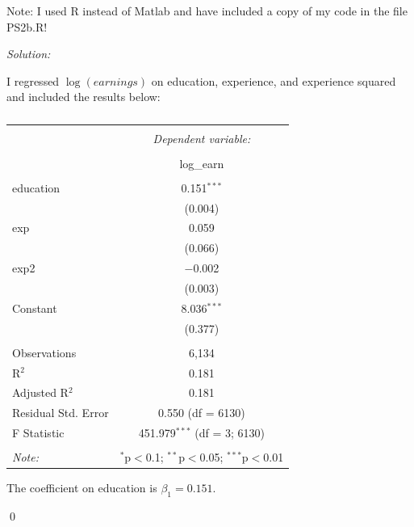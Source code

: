\documentclass[12pt]{article}
\newenvironment{problem}[2][Problem]{\begin{trivlist}
\item[\hskip \labelsep {\bfseries #1}\hskip \labelsep {\bfseries #2.}]}{\end{trivlist}}
\newenvironment{sol}
    {\emph{Solution:}
    }
    {
    \qed
    }
\begin{document}
Note: I used R instead of Matlab and have included a copy of my code in the file PS2b.R! 

\begin{problem}{1}
\end{problem}
\begin{sol}
I regressed $\log(earnings)$ on education, experience, and experience squared and included the results below:
\begin{table}[!htbp] \centering 
  \caption{} 
  \label{} 
\begin{tabular}{@{\extracolsep{5pt}}lc} 
\\[-1.8ex]\hline 
\hline \\[-1.8ex] 
 & \multicolumn{1}{c}{\textit{Dependent variable:}} \\ 
\cline{2-2} 
\\[-1.8ex] & log\_earn \\ 
\hline \\[-1.8ex] 
 education & 0.151$^{***}$ \\ 
  & (0.004) \\ 
 exp & 0.059 \\ 
  & (0.066) \\ 
 exp2 & $-$0.002 \\ 
  & (0.003) \\ 
 Constant & 8.036$^{***}$ \\ 
  & (0.377) \\ 
\hline \\[-1.8ex] 
Observations & 6,134 \\ 
R$^{2}$ & 0.181 \\ 
Adjusted R$^{2}$ & 0.181 \\ 
Residual Std. Error & 0.550 (df = 6130) \\ 
F Statistic & 451.979$^{***}$ (df = 3; 6130) \\ 
\hline 
\hline \\[-1.8ex] 
\textit{Note:}  & \multicolumn{1}{r}{$^{*}$p$<$0.1; $^{**}$p$<$0.05; $^{***}$p$<$0.01} \\ 
\end{tabular} 
\end{table} 
The coefficient on education is $\beta_1 = 0.151$.
\end{sol}
\begin{problem}{2}
\end{problem}
\end{document}
